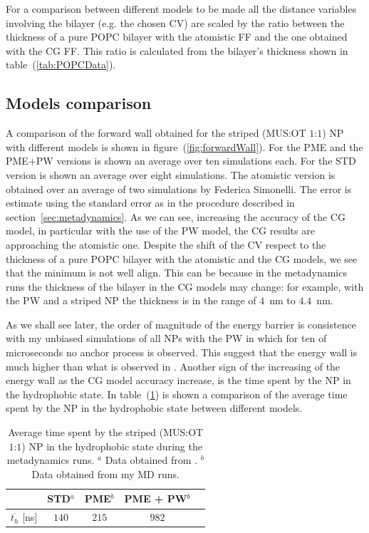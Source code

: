 For a comparison between different models to be made all the distance variables involving the bilayer (e.g. the chosen \ac{CV}) are scaled by the ratio between the thickness of a pure \ac{POPC} bilayer with the atomistic \ac{FF} and the one obtained with the \ac{CG} \ac{FF}. This ratio is calculated from the bilayer's thickness shown in table~(\ref{tab:POPCData}).
 
\subsection{Models comparison}
A comparison of the forward wall obtained for the striped (\ac{MUS}:\ac{OT} $1$:$1$) \ac{NP} with different models is shown in figure~(\ref{fig:forwardWall}). For the \ac{PME} and the \ac{PME}+\ac{PW} versions is shown an average over ten simulations each. For the STD version is shown an average over eight simulations. The atomistic version is obtained over an average of two simulations by Federica Simonelli. The error is estimate using the standard error as in the procedure described in section~\ref{sec:metadynamics}. As we can see, increasing the accuracy of the \ac{CG} model, in particular with the use of the \ac{PW} model, the \ac{CG} results are approaching the atomistic one. Despite the shift of the \ac{CV} respect to the thickness of a pure \ac{POPC} bilayer with the atomistic and the \ac{CG} models, we see that the minimum is not well align. This can be because in the metadynamics runs the thickness of the bilayer in the \ac{CG} models may change: for example, with the \ac{PW} and a striped \ac{NP} the thickness is in the range of $4$~nm to $4.4$~nm.

As we shall see later, the order of magnitude of the energy barrier is consistence with my unbiased simulations of all \acp{NP} with the \ac{PW} in which for ten of microseconds no anchor process is observed. This suggest that the energy wall is much higher than what is observed in \cite{ourPaper}. Another sign of the increasing of the energy wall as the \ac{CG} model accuracy increase, is the time spent by the \ac{NP} in the hydrophobic state. In table~(\ref{tab:hydroTime}) is shown a comparison of the average time spent by the \ac{NP} in the hydrophobic state between different models.
\begin{table}[h!t]
	\centering
	\begin{tabular}{lcccc}
		\toprule
		\,				& STD$^a$	& \acs{PME}$^b$	& \acs{PME} + \acs{PW}$^b$  \\ \toprule
	$\overline{t_{h}}$ [ns]	& $140$ & $215$			& $982$					 	\\ \bottomrule
	\end{tabular}
	\caption{Average time spent by the striped (\acs{MUS}:\acs{OT} $1$:$1$) \acs{NP} in the hydrophobic state during the metadynamics runs. \footnotesize $^a$ Data obtained from \cite{ourPaper}. $^b$ Data obtained from my \acs{MD} runs.}
	\label{tab:hydroTime}
\end{table}


